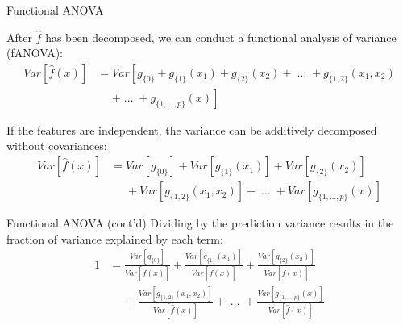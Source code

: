 \documentclass[aspectratio=169]{../latex_main/tntbeamer}  %
\newcommand{\predvar}{Var\left[\hat{f}(x)\right]}
\begin{document}
\begin{frame}[c]{Functional ANOVA}
	
	After $\hat{f}$ has been decomposed, we can conduct a functional analysis of variance (fANOVA):
		\begin{align*}
		Var\left[\hat{f}(x)\right] &= Var\left[g_{\{0\}} + g_{\{1\}}(x_1) + g_{\{2\}}(x_2) + \;\dots\; + g_{\{1, 2\}}(x_1, x_2) \right. \\
		&\phantom{{}={}} \left. + \;\dots\; + g_{\{1,\ldots,p\}}(x) \right]
		\end{align*}
		\pause
		
		If the features are independent, the variance can be additively decomposed without covariances:
		\begin{align*}
		Var\left[\hat{f}(x)\right] &= Var\left[g_{\{0\}}\right] + Var\left[g_{\{1\}}(x_1)\right] + Var\left[g_{\{2\}}(x_2)\right] \\
		&\phantom{{}={}} + Var\left[g_{\{1, 2\}}(x_1, x_2)\right] + \;\dots\; + Var\left[g_{\{1,\ldots,p\}}(x)\right]
		\end{align*}
\end{frame}
		
\begin{frame}[c]{Functional ANOVA (cont'd)}
		Dividing by the prediction variance results in the fraction of variance explained by each term:
		\begin{align*}
		1 &= \frac{Var\left[g_{\{0\}}\right]}{\predvar} + \frac{Var\left[g_{\{1\}}(x_1)\right]}{\predvar} + \frac{Var\left[g_{\{2\}}(x_2)\right]}{\predvar} \\
		&\phantom{{}={}} + \frac{Var\left[g_{\{1, 2\}}(x_1, x_2)\right]}{\predvar} + \;\dots\; + \frac{Var\left[g_{\{1,\ldots,p\}}(x)\right]}{\predvar}
		\end{align*}
		
	
\end{frame}

\end{document}

